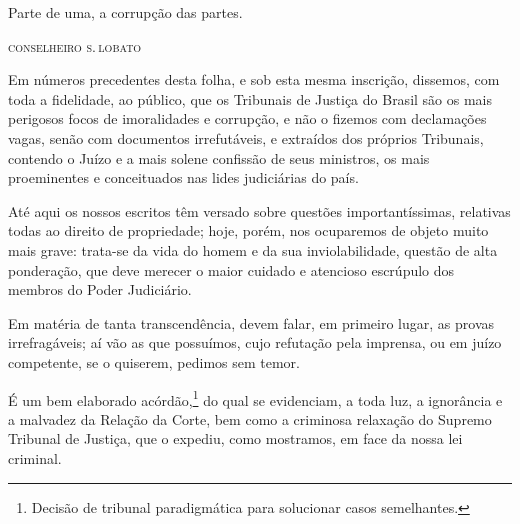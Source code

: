 \epigraph{Parte de uma, a corrupção das partes.}{\textsc{conselheiro s.\,lobato}\footnotemark}


Em números precedentes desta folha, e sob esta mesma inscrição,
dissemos, com toda a fidelidade, ao público, que os Tribunais de Justiça
do Brasil são os mais perigosos focos de imoralidades e corrupção, e não
o fizemos com declamações vagas, senão com documentos irrefutáveis, e
extraídos dos próprios Tribunais, contendo o Juízo e a mais solene
confissão de seus ministros, os mais proeminentes e conceituados nas
lides judiciárias do país.

Até aqui os nossos escritos têm versado sobre questões importantíssimas,
relativas todas ao direito de propriedade; hoje, porém, nos ocuparemos
de objeto muito mais grave: trata-se da vida do homem e da sua
inviolabilidade, questão de alta ponderação, que deve merecer o maior
cuidado e atencioso escrúpulo dos membros do Poder Judiciário.

Em matéria de tanta transcendência, devem falar, em primeiro lugar, as
provas irrefragáveis; aí vão as que possuímos, cujo refutação pela
imprensa, ou em juízo competente, se o quiserem, pedimos sem temor.

É um bem elaborado acórdão,\footnote{Decisão de tribunal paradigmática
  para solucionar casos semelhantes.} do qual se evidenciam,
a toda luz, a ignorância e a malvadez da Relação da Corte, bem como a
criminosa relaxação do Supremo Tribunal de Justiça, que o expediu, como
mostramos, em face da nossa lei criminal.

